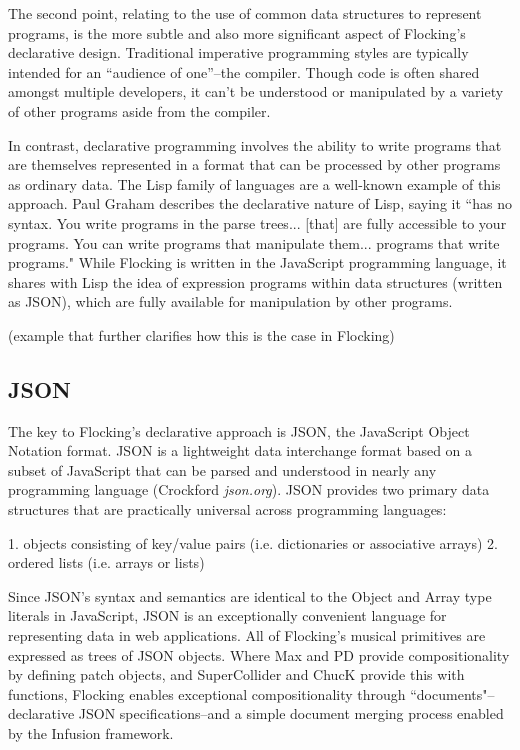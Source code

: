 \documentclass{article}
\begin{document}
The second point, relating to the use of common data structures to represent programs, is the more subtle and also more significant aspect of Flocking’s declarative design. Traditional imperative programming styles are typically intended for an “audience of one”--the compiler. Though code is often shared amongst multiple developers, it can’t be understood or manipulated by a variety of other programs aside from the compiler.

In contrast, declarative programming involves the ability to write programs that are themselves represented in a format that can be processed by other programs as ordinary data. The Lisp family of languages are a well-known example of this approach. Paul Graham describes the declarative nature of Lisp, saying it ``has no syntax. You write programs in the parse trees... [that] are fully accessible to your programs. You can write programs that manipulate them... programs that write programs." While Flocking is written in the JavaScript programming language, it shares with Lisp the idea of expression programs within data structures (written as JSON), which are fully available for manipulation by other programs.

(example that further clarifies how this is the case in Flocking)

\subsection{JSON}

The key to Flocking's declarative approach is JSON, the JavaScript Object Notation format. JSON is a lightweight data interchange format based on a subset of JavaScript that can be parsed and understood in nearly any programming language (Crockford {\it json.org}). JSON provides two primary data structures that are practically universal across programming languages:

1. objects consisting of key/value pairs (i.e. dictionaries or associative arrays)
2. ordered lists (i.e. arrays or lists)

Since JSON's syntax and semantics are identical to the Object and Array type literals in JavaScript, JSON is an exceptionally convenient language for representing data in web applications. All of Flocking's musical primitives are expressed as trees of JSON objects. Where Max and PD provide compositionality by defining patch objects, and SuperCollider and ChucK provide this with functions, Flocking enables exceptional compositionality through ``documents"--declarative JSON specifications--and a simple document merging process enabled by the Infusion framework.
\end{document}
